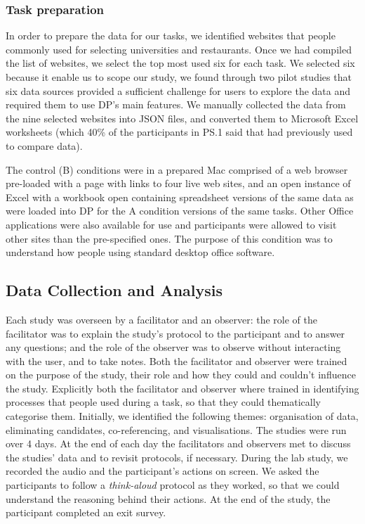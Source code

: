 \documentclass{sigchi}
\begin{document}
\subsubsection{Task preparation}
In order to prepare the data for our tasks, we identified websites that people commonly used for selecting universities and restaurants.  Once we had compiled the list of websites, we select the top most used six for each task.  We selected six because it enable us to scope our study, we found through two pilot studies that six data sources provided a sufficient challenge for users to explore the data and required them to use DP's main features.  We manually collected the data from the nine selected websites into JSON files, and converted them to Microsoft Excel worksheets (which 40\% of the participants in PS.1 said that had previously used to compare data).

The control (B) conditions were in a prepared Mac comprised of a web browser pre-loaded with a page with links to four live web sites, and an open instance of Excel with a workbook open containing spreadsheet versions of the same data as were loaded into DP for the A condition versions of the same tasks.  Other Office applications were also available for use and participants were allowed to visit other sites than the pre-specified ones.  The purpose of this condition was to understand how people using standard desktop office software.

\subsection{Data Collection and Analysis}
Each study was overseen by a facilitator and an observer:  the role of the facilitator was to explain the study's protocol to the participant and to answer any questions; and the role of the observer was to observe without interacting with the user, and to take notes.  Both the facilitator and observer were trained on the purpose of the study, their role and how they could and couldn't influence the study.   Explicitly both the facilitator and observer where trained in identifying processes that people used during a task, so that they could thematically categorise them.  Initially, we identified the following themes: organisation of data, eliminating candidates, co-referencing, and visualisations. The studies were run over 4 days.  At the end of each day the facilitators and observers met to discuss the studies' data and to revisit protocols, if necessary.  During the lab study, we recorded the audio and the participant's actions on screen. We asked the participants to follow a \emph{think-aloud} protocol as they worked, so that we could understand the reasoning behind their actions.  At the end of the study, the participant completed an exit survey.
\end{document}
